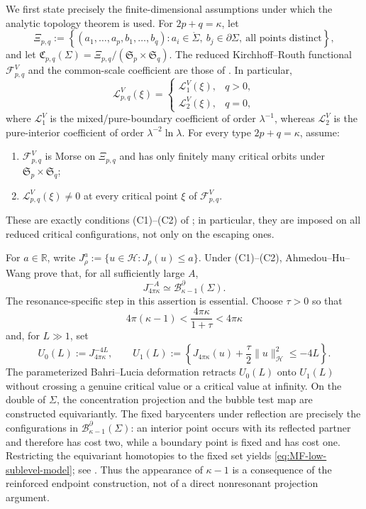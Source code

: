 \documentclass[11pt,a4paper]{article}
\numberwithin{equation}{section}
\theoremstyle{definition}
\theoremstyle{remark}
\newcommand{\R}{\mathbb{R}}
\newcommand{\Si}{\Sigma}
\newcommand{\pa}{\partial}
\newcommand{\BB}{\mathcal B}
\begin{document}
We first state precisely the finite-dimensional assumptions under which the
analytic topology theorem is used. For \(2p+q=\kappa\), let
\[
\Xi_{p,q}:=
\left\{(a_1,\ldots,a_p,b_1,\ldots,b_q):
a_i\in\mathring\Si,\ b_j\in\pa\Si,\ \text{all points distinct}\right\},
\]
and let
\(\mathfrak C_{p,q}(\Si)=\Xi_{p,q}/(\mathfrak S_p\times\mathfrak S_q)\).
The reduced Kirchhoff--Routh functional
\(\mathcal F_{p,q}^V\) and the common-scale coefficient are those of
\cite[(1.3)--(1.6)]{AHW2026}. In particular,
\begin{equation}\label{eq:L-piecewise}
\mathcal L_{p,q}^V(\xi)=
\begin{cases}
\mathcal L_1^V(\xi),&q>0,\\
\mathcal L_2^V(\xi),&q=0,
\end{cases}
\end{equation}
where \(\mathcal L_1^V\) is the mixed/pure-boundary coefficient of order
\(\lambda^{-1}\), whereas \(\mathcal L_2^V\) is the pure-interior
coefficient of order \(\lambda^{-2}\ln\lambda\).
For every type \(2p+q=\kappa\), assume:
\begin{enumerate}[(C1)]
\item \(\mathcal F_{p,q}^V\) is Morse on \(\Xi_{p,q}\) and has only
finitely many critical orbits under
\(\mathfrak S_p\times\mathfrak S_q\);
\item \(\mathcal L_{p,q}^V(\xi)\ne0\) at every critical point
\(\xi\) of \(\mathcal F_{p,q}^V\).
\end{enumerate}
These are exactly conditions (C1)--(C2) of \cite{AHW2026}; in particular,
they are imposed on all reduced critical configurations, not only on the
escaping ones.

For \(a\in\R\), write
\(J_\rho^a:=\{u\in\mathcal H:J_\rho(u)\le a\}\). Under (C1)--(C2),
Ahmedou--Hu--Wang prove that, for all sufficiently large \(A\),
\begin{equation}\label{eq:MF-low-sublevel-model}
J_{4\pi\kappa}^{-A}\simeq \BB_{\kappa-1}^{\pa}(\Si).
\end{equation}
The resonance-specific step in this assertion is essential. Choose
\(\tau>0\) so that
\[
4\pi(\kappa-1)<\frac{4\pi\kappa}{1+\tau}<4\pi\kappa
\]
and, for \(L\gg1\), set
\[
U_0(L):=J_{4\pi\kappa}^{-4L},\qquad
U_1(L):=
\left\{J_{4\pi\kappa}(u)+\frac{\tau}{2}\|u\|_{\mathcal H}^2
\le-4L\right\}.
\]
The parameterized Bahri--Lucia deformation retracts \(U_0(L)\) onto
\(U_1(L)\) without crossing a genuine critical value or a critical value at
infinity. On the double of \(\Si\), the concentration projection and the
bubble test map are constructed equivariantly. The fixed barycenters under
reflection are precisely the configurations in
\(\BB_{\kappa-1}^{\pa}(\Si)\): an interior point occurs with its reflected
partner and therefore has cost two, while a boundary point is fixed and has
cost one. Restricting the equivariant homotopies to the fixed set yields
\eqref{eq:MF-low-sublevel-model}; see
\cite[Lemma~4.2 and Proposition~4.2]{AHW2026}. Thus the appearance of
\(\kappa-1\) is a consequence of the reinforced endpoint construction, not
of a direct nonresonant projection argument.
\end{document}
